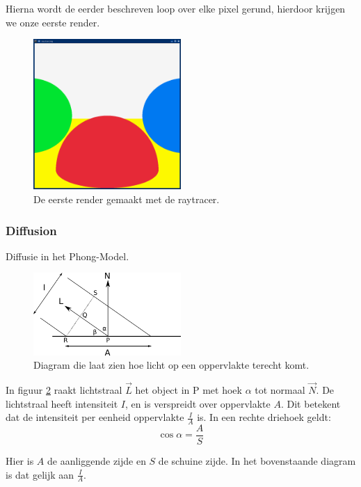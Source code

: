 \documentclass[12pt, a4paper]{article}
\begin{document}
Hierna wordt de eerder beschreven loop over elke pixel gerund, hierdoor krijgen we onze eerste render.
\begin{figure}[h]
    \centering
    \includegraphics[width=0.50\textwidth]{renders/first_raytraced.png}
    \caption{De eerste render gemaakt met de raytracer.}
    \label{fig:first_raytraced}
\end{figure}

\subsubsection{Diffusion}
Diffusie in het Phong-Model. 

\begin{figure}[h]
    \centering
    \includegraphics[width=0.50\textwidth]{diffuse-diagram.png}
    \caption{Diagram die laat zien hoe licht op een oppervlakte terecht komt.}
    \label{fig:diffuse-diagram}
\end{figure}


In figuur \ref{fig:diffuse-diagram} raakt lichtstraal $\overrightarrow{L}$ het object in P met hoek $\alpha$ tot normaal $\overrightarrow{N}$. De lichtstraal heeft intensiteit $I$, en is verspreidt over oppervlakte $A$. Dit betekent dat de intensiteit per eenheid oppervlakte $\frac{I}{A}$ is. In een rechte driehoek geldt: 
\[\cos{\alpha}=\frac{A}{S}\]

Hier is $A$ de aanliggende zijde en $S$ de schuine zijde. In het bovenstaande diagram is dat gelijk aan $\frac{I}{A}$.
\end{document}
